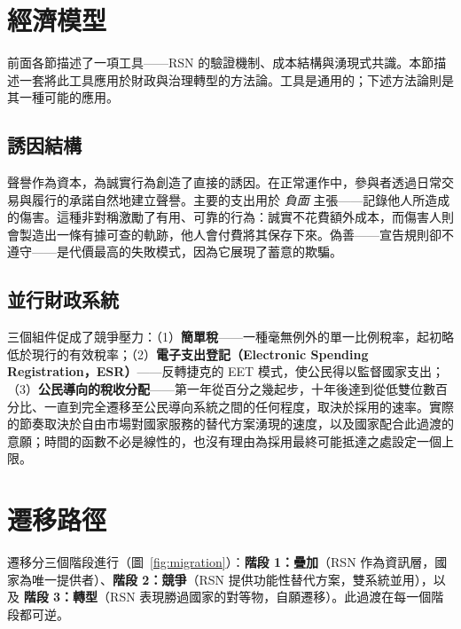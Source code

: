 \documentclass[11pt,a4paper,twocolumn]{article}
\begin{document}
\section{經濟模型}

前面各節描述了一項工具——RSN 的驗證機制、成本結構與湧現式共識。本節描述一套將此工具應用於財政與治理轉型的方法論。工具是通用的；下述方法論則是其一種可能的應用。

\subsection{誘因結構}

聲譽作為資本，為誠實行為創造了直接的誘因。在正常運作中，參與者透過日常交易與履行的承諾自然地建立聲譽。主要的支出用於 \emph{負面} 主張——記錄他人所造成的傷害。這種非對稱激勵了有用、可靠的行為：誠實不花費額外成本，而傷害人則會製造出一條有據可查的軌跡，他人會付費將其保存下來。偽善——宣告規則卻不遵守——是代價最高的失敗模式，因為它展現了蓄意的欺騙。

\subsection{並行財政系統}

三個組件促成了競爭壓力：（1）\textbf{簡單稅}——一種毫無例外的單一比例稅率，起初略低於現行的有效稅率；（2）\textbf{電子支出登記（Electronic Spending Registration，ESR）}——反轉捷克的 EET 模式，使公民得以監督國家支出；（3）\textbf{公民導向的稅收分配}——第一年從百分之幾起步，十年後達到從低雙位數百分比、一直到完全遷移至公民導向系統之間的任何程度，取決於採用的速率。實際的節奏取決於自由市場對國家服務的替代方案湧現的速度，以及國家配合此過渡的意願；時間的函數不必是線性的，也沒有理由為採用最終可能抵達之處設定一個上限。

\section{遷移路徑}

遷移分三個階段進行（圖~\ref{fig:migration}）：\textbf{階段 1：疊加}（RSN 作為資訊層，國家為唯一提供者）、\textbf{階段 2：競爭}（RSN 提供功能性替代方案，雙系統並用），以及 \textbf{階段 3：轉型}（RSN 表現勝過國家的對等物，自願遷移）。此過渡在每一個階段都可逆。
\end{document}
